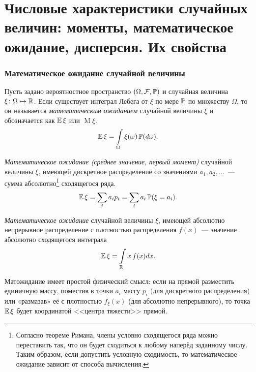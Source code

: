 \section{Числовые характеристики случайных величин: моменты, математическое ожидание, дисперсия. Их свойства}

\subsubsection{Математическое ожидание случайной величины}

\begin{defn}
    Пусть задано вероятностное пространство $(\Omega, \mathcal{F}, \operatorname{\mathbb{P}})$ и случайная величина $\xi \colon \Omega \mapsto \mathbb{R}$. 
    Если существует интеграл Лебега от $\xi$ по мере $\operatorname{\mathbb{P}}$ по множеству $\Omega$, то он называется \textit{математическим ожиданием} случайной величины $\xi$ и обозначается как $\operatorname{\mathbb{E}} \xi$ или $\operatorname{M} \! \xi$.
    \begin{equation*}
        \operatorname{\mathbb{E}} \xi = \int\limits_{\Omega} \xi(\omega) \operatorname{\mathbb{P}}(d\omega).
    \end{equation*}
\end{defn}

\begin{defn}
    \textit{Математическое ожидание (среднее значение, первый момент)} случайной величины $\xi$, 
    имеющей дискретное распределение со значениями $a_1, a_2, \ldots$~--- сумма абсолютно\footnote{Согласно теореме Римана, члены условно сходящегося ряда можно переставить так, что он будет сходиться к любому наперёд заданному числу. 
        Таким образом, если допустить условную сходимость, то математическое ожидание зависит от способа вычисления.} 
    сходящегося ряда.
    \begin{equation*}
        \operatorname{\mathbb{E}} \xi=\sum\limits_{i} a_{i} p_{i}=\sum\limits_{i} a_{i} \operatorname{\mathbb{P}}(\xi=a_{i}).
    \end{equation*}
\end{defn}

\begin{defn}
    \textit{Математическое ожидание} случайной величины $\xi$, имеющей абсолютно непрерывное распределение с плотностью распределения $f(x)$~--- значение абсолютно сходящегося интеграла
    \begin{equation*}
        \operatorname{\mathbb{E}} \xi=\int\limits_{\mathbb{R}} x \, f(x) dx.
    \end{equation*}
\end{defn}

Матожидание имеет простой физический смысл: если на прямой разместить единичную массу, поместив в точки $a_i$ массу $p_i$ (для дискретного распределения) или «размазав» её с плотностью $f_\xi(x)$ (для абсолютно непрерывного), то точка $\operatorname{\mathbb{E}} \xi$ будет координатой <<центра тяжести>> прямой.

